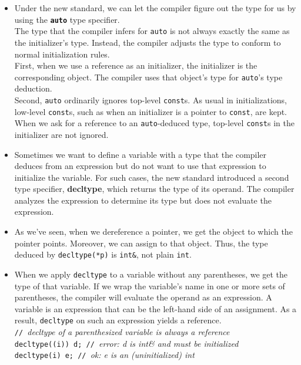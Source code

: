 \begin{itemize}
\item Under the new standard, we can let the compiler figure out the type for us by using the \textbf{\texttt{auto}} type specifier.\\The type that the compiler infers for \texttt{auto} is not always exactly the same as the initializer's type. Instead, the compiler adjusts the type to conform to normal initialization rules.\\First, when we use a reference as an initializer, the initializer is the corresponding object. The compiler uses that object's type for \texttt{auto}'s type deduction.\\Second, \texttt{auto} ordinarily ignores top-level \texttt{const}s. As usual in initializations, low-level \texttt{const}s, such as when an initializer is a pointer to \texttt{const}, are kept.\\When we ask for a reference to an \texttt{auto}-deduced type, top-level \texttt{const}s in the initializer are not ignored.

\item Sometimes we want to define a variable with a type that the compiler deduces from an expression but do not want to use that expression to initialize the variable. For such cases, the new standard introduced a second type specifier, \textbf{decltype}, which returns the type of its operand. The compiler analyzes the expression to determine its type but does not evaluate the expression.

\item As we've seen, when we dereference a pointer, we get the object to which the pointer points. Moreover, we can assign to that object. Thus, the type deduced by \texttt{decltype(*p)} is \texttt{int\&}, not plain \texttt{int}.

\item When we apply \texttt{decltype} to a variable without any parentheses, we get the type of that variable. If we wrap the variable's name in one or more sets of parentheses, the compiler will evaluate the operand as an expression. A variable is an expression that can be the left-hand side of an assignment. As a result, \texttt{decltype} on such an expression yields a reference.\\\hspace*{1em}\texttt{// }\textit{decltype of a parenthesized variable is always a reference}\\\hspace*{1em}\texttt{decltype((i)) d; // }\textit{error: d is int\& and must be initialized}\\\hspace*{1em}\texttt{decltype(i) e; // }\textit{ok: e is an (uninitialized) int}


\end{itemize}

